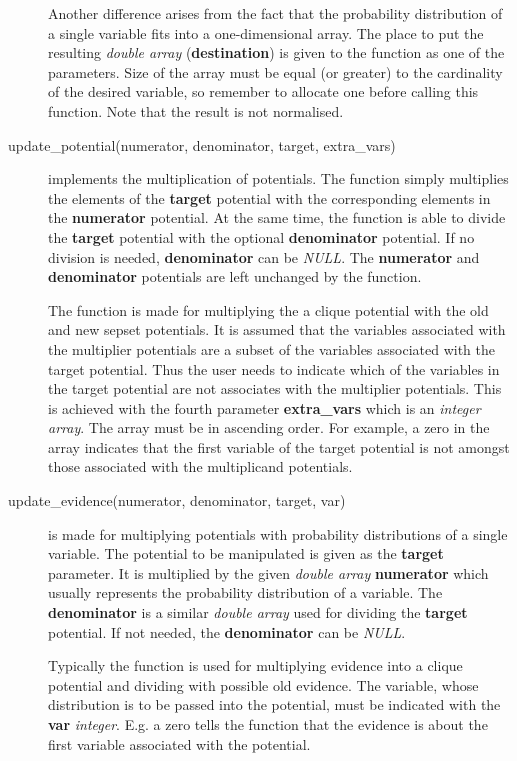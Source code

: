 \documentclass[12pt,a4paper]{report}
\newcommand{\cdatatype}[1]{{\it #1}}
\newcommand{\cparameter}[1]{\textbf{#1}}
\begin{document}
\begin{description}
Another difference arises from the fact that the probability 
distribution of a single variable fits into a one-dimensional array. 
The place to put the resulting \cdatatype{double array} 
(\cparameter{destination}) is given to the function as one of the
parameters. Size of the array must be equal (or greater) to the
cardinality of the desired variable, so remember to allocate one
before calling this function. Note that the result is not normalised.

\item[update\_potential(numerator, denominator, target, extra\_vars)] 
implements the multiplication of potentials. The function simply
multiplies the elements of the \cparameter{target} potential with the
corresponding elements in the \cparameter{numerator} potential. At the
same time, the function is able to divide the \cparameter{target}
potential with the optional \cparameter{denominator} potential. If no
division is needed, \cparameter{denominator} can be \cdatatype{NULL}.
The \cparameter{numerator} and \cparameter{denominator} potentials are 
left unchanged by the function.

The function is made for multiplying the a clique potential with the 
old and new sepset potentials. It is assumed that the variables
associated with the multiplier potentials are a subset of the
variables associated with the target potential. Thus the user needs to
indicate which of the variables in the target potential are not
associates with the multiplier potentials. This is achieved with the
fourth parameter \cparameter{extra\_vars} which is an 
\cdatatype{integer array}. The array must be in ascending order. For 
example, a zero in the array indicates that the first variable of the 
target potential is not amongst those associated with the multiplicand 
potentials.

\item[update\_evidence(numerator, denominator, target, var)] is made
for multiplying potentials with probability distributions of a single
variable. The potential to be manipulated is given as the
\cparameter{target} parameter. It is multiplied by the given 
\cdatatype{double array} \cparameter{numerator} which usually
represents the probability distribution of a variable. The 
\cparameter{denominator} is a similar \cdatatype{double array} used 
for dividing the \cparameter{target} potential. If not needed, the 
\cparameter{denominator} can be \cdatatype{NULL}.

Typically the function is used for multiplying evidence into a clique 
potential and dividing with possible old evidence. The variable, whose 
distribution is to be passed into the potential, must be indicated 
with the \cparameter{var} \cdatatype{integer}. E.g. a zero tells the 
function that the evidence is about the first variable associated with 
the potential.


\end{description}
\end{document}
